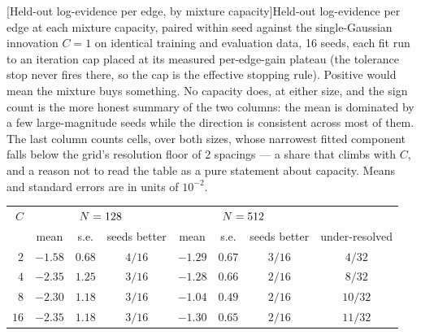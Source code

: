 
\begin{center}
\begin{minipage}{\linewidth}\small\centering
{}[Held-out log-evidence per edge, by mixture capacity]{Held-out log-evidence per edge at each mixture capacity,
paired within seed against the single-Gaussian innovation $C=1$ on identical
training and evaluation data, 16 seeds, each fit run to an iteration cap
placed at its measured per-edge-gain plateau (the tolerance stop never fires
there, so the cap is the effective stopping rule). Positive would mean the mixture buys something.
No capacity does, at either size, and the sign count is the more honest summary of
the two columns: the mean is dominated by a few large-magnitude seeds while the
direction is consistent across most of them. The last column counts cells, over
both sizes, whose narrowest fitted component falls below the grid's resolution
floor of 2 spacings --- a share that climbs with $C$, and a
reason not to read the table as a pure statement about capacity. Means and
standard errors are in units of $10^{-2}$.}
\label{tab:capacity}
\begin{tabular}{@{}rccccccc@{}}
\toprule
$C$ & \multicolumn{3}{c}{$N = 128$} & \multicolumn{3}{c}{$N = 512$} & \\
 & mean & s.e. & seeds better & mean & s.e. & seeds better & under-resolved \\
\midrule
$2$ & $-1.58$ & $0.68$ & $4/16$ & $-1.29$ & $0.67$ & $3/16$ & $4/32$ \\
$4$ & $-2.35$ & $1.25$ & $3/16$ & $-1.28$ & $0.66$ & $2/16$ & $8/32$ \\
$8$ & $-2.30$ & $1.18$ & $3/16$ & $-1.04$ & $0.49$ & $2/16$ & $10/32$ \\
$16$ & $-2.35$ & $1.18$ & $3/16$ & $-1.30$ & $0.65$ & $2/16$ & $11/32$ \\
\bottomrule
\end{tabular}
\end{minipage}
\end{center}
